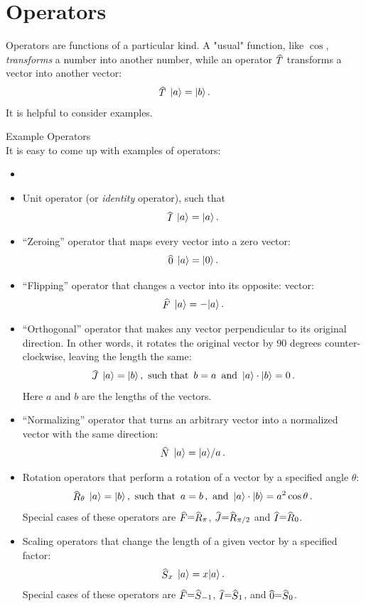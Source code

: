 \section{Operators}\label{sec:operators}
Operators are functions of a particular kind. A "usual" function, like $\cos$, \emph{transforms} a number into another number, while an operator $\op{T}$ transforms a vector into another vector:
\[
\op{T}\,\ket{a} = \ket{b}\,.
\]
It is helpful to consider examples.
\begin{mybio}{Example Operators}\\
	It is easy to come up with examples of operators:
	
	\begin{itemize}
		\item\phantom{x}
		
		\item Unit operator (or \emph{identity} operator), such that
		\[
		\op{I}\,\ket{a}=\ket{a}\,.
		\]
		
		\item ``Zeroing'' operator that maps every vector into a zero
		vector:
		\[
		\op{0}\, \ket{a} = \ket{0}\,.
		\]
		
		\item ``Flipping'' operator that changes a vector into its opposite:
		vector:
		\[
		\op{F}\, \ket{a} = -\ket{a}\,.
		\]
		
		\item ``Orthogonal'' operator that makes any vector perpendicular to its original direction. In other words, it rotates the original vector by $90$ degrees counter-clockwise, leaving the length the same:
		\[
		\op{J}\, \ket{a} = \ket{b}\,,\textrm{ such that }\, b=a\,\textrm{ and }\,\ket{a}\cdot\ket{b}=0\,.
		\]
		Here $a$ and $b$ are the lengths of the vectors.
		
		\item ``Normalizing'' operator that turns an arbitrary vector into a normalized vector with the same direction:
		\[
		\op{N}\, \ket{a} = \ket{a}/a\,.
		\]
		
		\item Rotation operators that perform a rotation of a vector by a specified angle $\theta$:
		\[
		\op{R}_\theta\, \ket{a} = \ket{b}\,,\textrm{ such that }\, a=b\,,\textrm{ and } \,\ket{a}\cdot\ket{b}=a^2\cos\theta\,.
		\]
		Special cases of these operators are $\op{F}=\op{R}_\pi$, $\op{J}=\op{R}_{\pi/2}$ and $\op{I}=\op{R}_0$.
		
		\item Scaling operators that change the length of a given vector by a specified factor:
		\[
		\op{S}_x\, \ket{a} = x\ket{a}\,.
		\]
		Special cases of these operators are $\op{F}=\op{S}_{-1}$, $\op{I}=\op{S}_1$, and $\op{0}=\op{S}_0$.
		
	\end{itemize}
\end{mybio}

